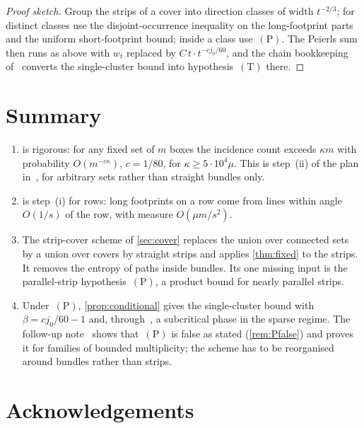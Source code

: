 \documentclass[11pt,letterpaper]{article}
\begin{document}
\begin{proof}[Proof sketch]
Group the strips of a cover into direction classes of width $t^{-2/3}$; for distinct classes use the disjoint-occurrence inequality on the long-footprint parts and the uniform short-footprint bound; inside a class use~$\mathrm{(P)}$. The Peierls sum then runs as above with $w_t$ replaced by $C\,t\cdot t^{-cj_0/60}$, and the chain bookkeeping of~\cite{FM26} converts the single-cluster bound into hypothesis~$\mathrm{(T)}$ there.
\end{proof}

\section{Summary}
\label{sec:summary}

\begin{enumerate}
  \item {} is rigorous: for any fixed set of $m$ boxes the incidence count exceeds $\kappa m$ with probability $O(m^{-c\kappa})$, $c=1/80$, for $\kappa\ge5\cdot10^4\mu$. This is step~(ii) of the plan in~\cite[Section~5]{FM26}, for arbitrary sets rather than straight bundles only.
  \item {} is step~(i) for rows: long footprints on a row come from lines within angle $O(1/s)$ of the row, with measure $O(\mu m/s^2)$.
  \item The strip-cover scheme of \cref{sec:cover} replaces the union over connected sets by a union over covers by straight strips and applies \cref{thm:fixed} to the strips. It removes the entropy of paths inside bundles. Its one missing input is the parallel-strip hypothesis~$\mathrm{(P)}$, a product bound for nearly parallel strips.
  \item Under~$\mathrm{(P)}$, \cref{prop:conditional} gives the single-cluster bound with $\beta=cj_0/60-1$ and, through~\cite{FM26}, a subcritical phase in the sparse regime. The follow-up note~\cite{PS26} shows that~$\mathrm{(P)}$ is false as stated (\cref{rem:Pfalse}) and proves it for families of bounded multiplicity; the scheme has to be reorganised around bundles rather than strips.
\end{enumerate}

\section*{Acknowledgements}
\end{document}
